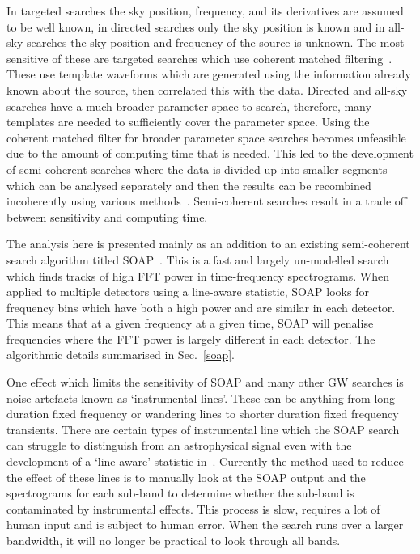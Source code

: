 %
In targeted searches the sky position, frequency, and its derivatives are
assumed to be well known, in directed searches only the sky position is
known and in all-sky searches the sky position and frequency of the source is unknown.
The most sensitive of these are targeted searches which use coherent matched
filtering~\cite{dupuis2005BayesianEstimation,schutz1998DataAnalysis}. These use
template waveforms which are generated using the information already known about the
source, then correlated this with the data. Directed and all-sky searches have
a much broader parameter space to search, therefore, many templates are needed
to sufficiently cover the parameter space. Using the coherent matched filter
for broader parameter space searches becomes unfeasible due to the amount of
computing time that is needed. This led to the development of semi-coherent
searches where the data is divided up into smaller segments which can be analysed
separately and then the results can be recombined incoherently using various
methods~\cite{abbott2019AllskySearch,creighton2000SearchingPeriodic}. Semi-coherent
searches result in a trade off between sensitivity and computing time.

%
The analysis here is presented mainly as an addition to an existing
semi-coherent search algorithm titled SOAP~\cite{bayley2019SOAPGeneralised}.
This is a fast and largely un-modelled search which finds tracks of
high \ac{FFT} power in time-frequency spectrograms. 
When applied to multiple detectors using a line-aware statistic, SOAP looks for frequency bins which have both a high power and are similar in each detector. 
This means that  at a given frequency at a given time, SOAP will penalise frequencies where the \ac{FFT} power is largely different in each detector.  
The algorithmic details summarised in Sec.~\ref{soap}. 

%

One effect which limits the sensitivity of SOAP and many other
\ac{GW} searches is noise artefacts known as `instrumental lines'. These can be anything
from long duration fixed frequency or wandering lines to shorter duration fixed frequency transients. 
There are certain types of instrumental line which the SOAP search can struggle to distinguish from an astrophysical signal even with the development of a
`line aware' statistic in~\cite{bayley2019SOAPGeneralised}. Currently the
method used to reduce the effect of these lines is to manually look at the SOAP
output and the spectrograms for each sub-band to determine whether the sub-band
is contaminated by instrumental effects. This process is slow, requires a
lot of human input and is subject to human error. When the search runs over
a larger bandwidth, it will no longer be practical to look
through all bands. 

